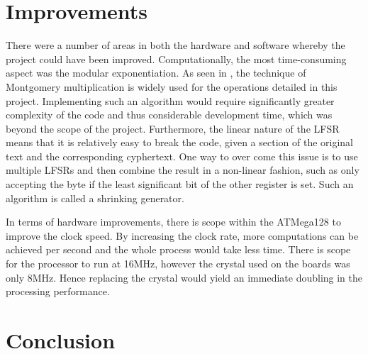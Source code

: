 \documentclass[a4paper,11pt,twocolumn]{article}
\begin{document}
	\section{Improvements}
	There were a number of areas in both the hardware and software whereby the project could have been improved. Computationally, the most time-consuming aspect was the modular exponentiation. As seen in \cite{montgomery1985modular}, the technique of Montgomery multiplication is widely used for the operations detailed in this project. Implementing such an algorithm would require significantly greater complexity of the code and thus considerable development time, which was beyond the scope of the project. Furthermore, the linear nature of the LFSR means that it is relatively easy to break the code, given a section of the original text and the corresponding cyphertext. One way to over come this issue is to use multiple LFSRs and then combine the result in a non-linear fashion, such as only accepting the byte if the least significant bit of the other register is set. Such an algorithm is called a shrinking generator\cite{coppersmith1993shrinking}. 
	
	In terms of hardware improvements, there is scope within the ATMega128 to improve the clock speed. By increasing the clock rate, more computations can be achieved per second and the whole process would take less time. There is scope for the processor to run at 16MHz, however the crystal used on the boards was only 8MHz. Hence replacing the crystal would yield an immediate doubling in the processing performance.
		
	\section{Conclusion}
	
	
	
	
\end{document}
